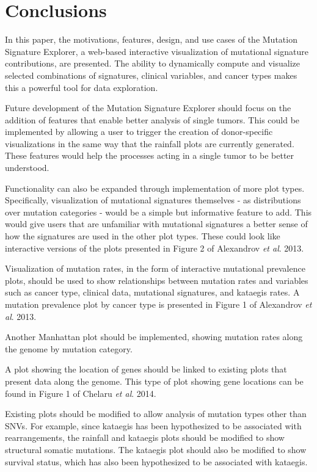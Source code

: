 \documentclass[12pt, letterpaper]{article}
\begin{document}
\section{Conclusions}
In this paper, the motivations, features, design, and use cases of the Mutation Signature Explorer, a web-based interactive visualization of mutational signature contributions, are presented. 
The ability to dynamically compute and visualize selected combinations of signatures, clinical variables, and cancer types makes this a powerful tool for data exploration.

Future development of the Mutation Signature Explorer should focus on the addition of features that enable better analysis of single tumors. 
This could be implemented by allowing a user to trigger the creation of donor-specific visualizations in the same way that the rainfall plots are currently generated.
These features would help the processes acting in a single tumor to be better understood.

Functionality can also be expanded through implementation of more plot types.
Specifically, visualization of mutational signatures themselves - as distributions over mutation categories - would be a simple but informative feature to add.
This would give users that are unfamiliar with mutational signatures a better sense of how the signatures are used in the other plot types.
These could look like interactive versions of the plots presented in Figure 2 of Alexandrov \textit{et al}. 2013\cite{alexandrov2013signatures}.

Visualization of mutation rates, in the form of interactive mutational prevalence plots, should be used to show relationships between mutation rates and variables such as cancer type, clinical data, mutational signatures, and kataegis rates.
A mutation prevalence plot by cancer type is presented in Figure 1 of Alexandrov \textit{et al}. 2013\cite{alexandrov2013signatures}.

Another Manhattan plot should be implemented, showing mutation rates along the genome by mutation category.

A plot showing the location of genes should be linked to existing plots that present data along the genome.
This type of plot showing gene locations can be found in Figure 1 of Chelaru \textit{et al}. 2014\cite{chelaru2014epiviz}.

Existing plots should be modified to allow analysis of mutation types other than SNVs. 
For example, since kataegis has been hypothesized to be associated with rearrangements, the rainfall and kataegis plots should be modified to show structural somatic mutations. The kataegis plot should also be modified to show survival status, which has also been hypothesized to be associated with kataegis.
\end{document}
